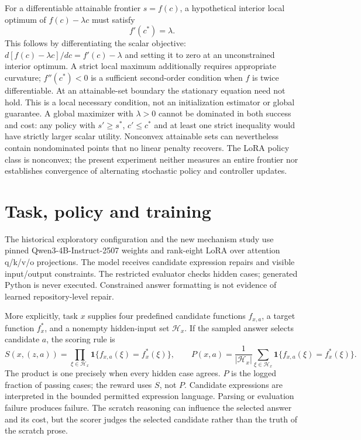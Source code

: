 \documentclass[11pt]{article}
\begin{document}
For a differentiable attainable frontier $s=f(c)$, a hypothetical interior local optimum of $f(c)-\lambda c$ must satisfy
\begin{equation}
 f'(c^*)=\lambda.
 \label{eq:tangent}
\end{equation}
This follows by differentiating the scalar objective: $d[f(c)-\lambda c]/dc=f'(c)-\lambda$ and setting it to zero at an unconstrained interior optimum. A strict local maximum additionally requires appropriate curvature; $f''(c^*)<0$ is a sufficient second-order condition when $f$ is twice differentiable. At an attainable-set boundary the stationary equation need not hold.
This is a local necessary condition, not an initialization estimator or global guarantee. A global maximizer with $\lambda>0$ cannot be dominated in both success and cost: any policy with $s'\geq s^*$, $c'\leq c^*$ and at least one strict inequality would have strictly larger scalar utility. Nonconvex attainable sets can nevertheless contain nondominated points that no linear penalty recovers. The LoRA policy class is nonconvex; the present experiment neither measures an entire frontier nor establishes convergence of alternating stochastic policy and controller updates.

\section{Task, policy and training}
\label{sec:training}

The historical exploratory configuration and the new mechanism study use pinned Qwen3-4B-Instruct-2507 weights and rank-eight LoRA over attention q/k/v/o projections. The model receives candidate expression repairs and visible input/output constraints. The restricted evaluator checks hidden cases; generated Python is never executed. Constrained answer formatting is not evidence of learned repository-level repair.

More explicitly, task $x$ supplies four predefined candidate functions $f_{x,a}$, a target function $f_x^*$, and a nonempty hidden-input set $\mathcal H_x$. If the sampled answer selects candidate $a$, the scoring rule is
\begin{equation}
 S(x,(z,a))=\prod_{\xi\in\mathcal H_x}
          \mathbf1\{f_{x,a}(\xi)=f_x^*(\xi)\},\qquad
 P(x,a)=\frac1{|\mathcal H_x|}\sum_{\xi\in\mathcal H_x}
          \mathbf1\{f_{x,a}(\xi)=f_x^*(\xi)\}.
\end{equation}
The product is one precisely when every hidden case agrees. $P$ is the logged fraction of passing cases; the reward uses $S$, not $P$. Candidate expressions are interpreted in the bounded permitted expression language. Parsing or evaluation failure produces failure. The scratch reasoning can influence the selected answer and its cost, but the scorer judges the selected candidate rather than the truth of the scratch prose.
\end{document}
